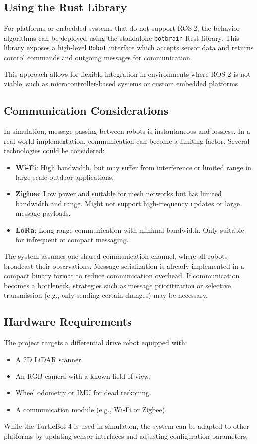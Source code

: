 \subsection{Using the Rust Library}
For platforms or embedded systems that do not support ROS 2, the behavior algorithms can be deployed using the standalone \texttt{botbrain} Rust library. 
This library exposes a high-level \texttt{Robot} interface which accepts sensor data and returns control commands and outgoing messages for communication.


This approach allows for flexible integration in environments where ROS 2 is not viable, such as microcontroller-based systems or custom embedded platforms.

\subsection{Communication Considerations}\label{sub:communication}
In simulation, message passing between robots is instantaneous and lossless. 
In a real-world implementation, communication can become a limiting factor. 
Several technologies could be considered:

\begin{itemize}
  \item \textbf{Wi-Fi}: High bandwidth, but may suffer from interference or limited range in large-scale outdoor applications.
  \item \textbf{Zigbee}: Low power and suitable for mesh networks but has limited bandwidth and range. Might not support high-frequency updates or large message payloads.
  \item \textbf{LoRa}: Long-range communication with minimal bandwidth. Only suitable for infrequent or compact messaging.
\end{itemize}

The system assumes one shared communication channel, where all robots broadcast their observations. 
Message serialization is already implemented in a compact binary format to reduce communication overhead. 
If communication becomes a bottleneck, strategies such as message prioritization or selective transmission (e.g., only sending certain changes) may be necessary.

\subsection{Hardware Requirements}
The project targets a differential drive robot equipped with:
\begin{itemize}
  \item A 2D LiDAR scanner.
  \item An RGB camera with a known field of view.
  \item Wheel odometry or IMU for dead reckoning.
  \item A communication module (e.g., Wi-Fi or Zigbee).
\end{itemize}

While the TurtleBot 4 is used in simulation, the system can be adapted to other platforms by updating sensor interfaces and adjusting configuration parameters.
